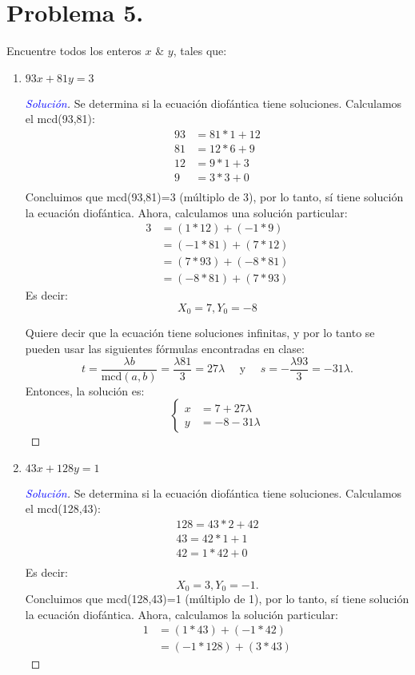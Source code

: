 \documentclass[a4paper,12pt]{article}
\newenvironment{solution}
  {\renewcommand\qedsymbol{$\square$}\begin{proof}[\textcolor{blue}{Solución}]}
  {\end{proof}}
\begin{document}
\section{Problema 5.} Encuentre todos los enteros $x$ \& $y$, tales que:
\begin{enumerate}[label=\alph*.]
	\item $93 x+81 y=3$
	\begin{solution}
		Se determina si la ecuación diofántica tiene soluciones. Calculamos el mcd(93,81):
		\begin{align*}
			 93 &= 81*1 + 12\\
			81 &= 12*6 + 9\\
			12 &= 9*1 + 3\\
			9 &= 3*3 + 0\\
		\end{align*}
	Concluimos que mcd(93,81)=3 (múltiplo de 3), por lo tanto, sí tiene solución la ecuación diofántica. Ahora, calculamos una solución particular: 
	\begin{align*}
		3	&=	(1 * 12) + (-1 * 9)\\
		&=	(-1 * 81) + (7 * 12)\\
		&=	(7 * 93) + (-8 * 81)\\
		&=	(-8 * 81) + (7 * 93)
	\end{align*}
Es decir:
$$X_0=7, Y_0=-8$$
	
	 Quiere decir que la ecuación tiene soluciones infinitas, y por lo tanto se pueden usar las siguientes fórmulas encontradas en clase: 
	$$t=\frac{\lambda b}{\text{mcd}(a,b)}=\frac{\lambda 81}{3}=27\lambda \quad\text{ y }\quad s=-\frac{\lambda 93}{3}=-31\lambda. $$
	Entonces, la solución es:
	$$\begin{cases}
		x &= 7+27\lambda\\
		y &= -8-31\lambda
	\end{cases}$$
	\end{solution}
	\item $43 x+128 y=1$
	\begin{solution}
		Se determina si la ecuación diofántica tiene soluciones. Calculamos el mcd(128,43):
		\begin{align*}
			 128 = 43*2 + 42\\
			43 = 42*1 + 1\\
			42 = 1*42 + 0\\
		\end{align*}
	Es decir:
	$$X_0=3,Y_0=-1.$$
		Concluimos que mcd(128,43)=1 (múltiplo de 1), por lo tanto, sí tiene solución la ecuación diofántica. Ahora, calculamos la solución particular: 
		\begin{align*}
			1	&=	(1 * 43) + (-1 * 42)\\
			&=	(-1 * 128) + (3 * 43)
		\end{align*}
		

\end{solution}
\end{enumerate}
\end{document}
